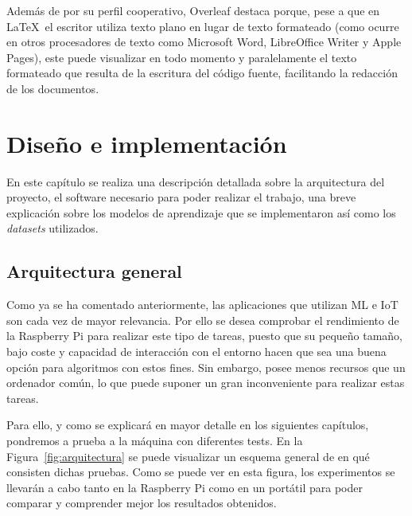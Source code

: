 \documentclass[a4paper, 12pt]{book}
\begin{document}
Además de por su perfil cooperativo, Overleaf destaca porque, pese a que en \LaTeX~el escritor utiliza texto plano en lugar de texto formateado (como ocurre en otros procesadores de texto como Microsoft Word, LibreOffice Writer y Apple Pages), este puede visualizar en todo momento y paralelamente el texto formateado que resulta de la escritura del código fuente, facilitando la redacción de los documentos.

\cleardoublepage


\chapter{Diseño e implementación}
\label{chap:diseño}

En este capítulo se realiza una descripción detallada sobre la arquitectura del proyecto, el software necesario para poder realizar el trabajo, una breve explicación sobre los modelos de aprendizaje que se implementaron así como los \textit{datasets} utilizados.

\section{Arquitectura general} 
\label{sec:arquitectura}

Como ya se ha comentado anteriormente, las aplicaciones que utilizan ML e IoT son cada vez de mayor relevancia. Por ello se desea comprobar el rendimiento de la Raspberry Pi para realizar este tipo de tareas, puesto que su pequeño tamaño, bajo coste y capacidad de interacción con el entorno hacen que sea una buena opción para algoritmos con estos fines. Sin embargo, posee menos recursos que un ordenador común, lo que puede suponer un gran inconveniente para realizar estas tareas. 

Para ello, y como se explicará en mayor detalle en los siguientes capítulos, pondremos a prueba a la máquina con diferentes tests. En la Figura~\ref{fig:arquitectura} se puede visualizar un esquema general de en qué consisten dichas pruebas. Como se puede ver en esta figura, los experimentos se llevarán a cabo tanto en la Raspberry Pi como en un portátil para poder comparar y comprender mejor los resultados obtenidos.
\end{document}
